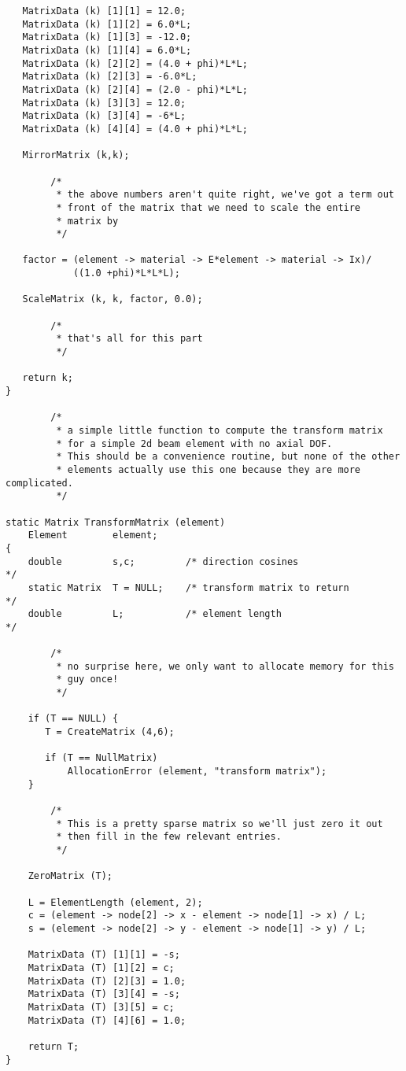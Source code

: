 {\begin{screen}
\begin{verbatim}
   MatrixData (k) [1][1] = 12.0;
   MatrixData (k) [1][2] = 6.0*L;
   MatrixData (k) [1][3] = -12.0;
   MatrixData (k) [1][4] = 6.0*L;
   MatrixData (k) [2][2] = (4.0 + phi)*L*L;
   MatrixData (k) [2][3] = -6.0*L;
   MatrixData (k) [2][4] = (2.0 - phi)*L*L;
   MatrixData (k) [3][3] = 12.0;
   MatrixData (k) [3][4] = -6*L;
   MatrixData (k) [4][4] = (4.0 + phi)*L*L;

   MirrorMatrix (k,k);

        /*
         * the above numbers aren't quite right, we've got a term out
         * front of the matrix that we need to scale the entire
         * matrix by
         */

   factor = (element -> material -> E*element -> material -> Ix)/
            ((1.0 +phi)*L*L*L);

   ScaleMatrix (k, k, factor, 0.0);

        /*
         * that's all for this part
         */

   return k;
}

        /*
         * a simple little function to compute the transform matrix
         * for a simple 2d beam element with no axial DOF.
         * This should be a convenience routine, but none of the other
         * elements actually use this one because they are more complicated.
         */

static Matrix TransformMatrix (element)
    Element        element;
{
    double         s,c;         /* direction cosines                    */
    static Matrix  T = NULL;    /* transform matrix to return           */
    double         L;           /* element length                       */

        /*
         * no surprise here, we only want to allocate memory for this
         * guy once!
         */

    if (T == NULL) {
       T = CreateMatrix (4,6);

       if (T == NullMatrix) 
           AllocationError (element, "transform matrix");
    }

        /*
         * This is a pretty sparse matrix so we'll just zero it out
         * then fill in the few relevant entries. 
         */

    ZeroMatrix (T);

    L = ElementLength (element, 2);
    c = (element -> node[2] -> x - element -> node[1] -> x) / L;
    s = (element -> node[2] -> y - element -> node[1] -> y) / L;

    MatrixData (T) [1][1] = -s;
    MatrixData (T) [1][2] = c;
    MatrixData (T) [2][3] = 1.0;
    MatrixData (T) [3][4] = -s;
    MatrixData (T) [3][5] = c;
    MatrixData (T) [4][6] = 1.0;

    return T;
}
 \end{verbatim}
\end{screen}}


